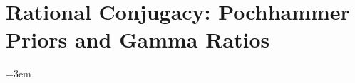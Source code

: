 \DeclareRobustCommand{\rcPH}{\mathrm{PH}}
\DeclareRobustCommand{\rcPPH}{\mathrm{PPH}}
\DeclareRobustCommand{\rcTPH}{\mathrm{TPH}}
\DeclareRobustCommand{\rcGa}{\mathrm{Ga}}
\DeclareRobustCommand{\rcBe}{\mathrm{Be}}
\DeclareRobustCommand{\rcExp}{\mathrm{Exp}}
\DeclareRobustCommand{\rcNB}{\mathrm{NB}}
\DeclareRobustCommand{\rcPG}{\mathrm{PG}}
\DeclareRobustCommand{\rcCRT}{\mathrm{CRT}}
\DeclareRobustCommand{\rcPoi}{\mathrm{Poi}}
\DeclareRobustCommand{\rcR}{\mathcal{R}}
\DeclareRobustCommand{\rcP}{\mathcal{P}}
\DeclareRobustCommand{\rcM}{\mathcal{M}}
\DeclareRobustCommand{\rcK}{\mathcal{K}}
\DeclareRobustCommand{\rcone}{\mathbf{1}}
\DeclareRobustCommand{\rcgE}{\gamma_{\mathrm{E}}}

\chapter{Rational Conjugacy: Pochhammer Priors and Gamma Ratios}\label{ch:rc}
\emergencystretch=3em

